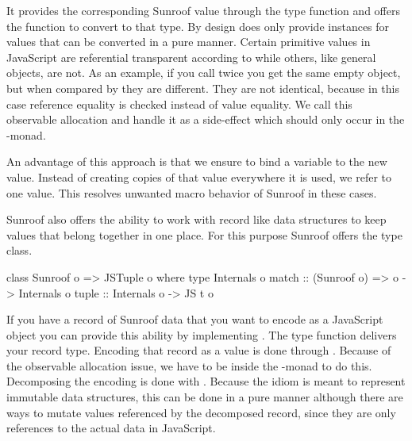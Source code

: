 It provides the corresponding Sunroof value through the type function
 \cite{Chakravarty:05:AssociatedTypeSynonyms} and offers the function 
 to convert to that type. By design  does
only provide instances for values that can be converted in a pure
manner. Certain primitive values in JavaScript are referential 
transparent according to \Src{==} while others, like general objects,
are not. As an example, if you call  twice you get the 
same empty object, but when compared by \Src{==} they are different. They
are not identical, because in this case reference equality is checked
instead of value equality. We call this observable allocation and handle 
it as a side-effect which should only occur in the \JS-monad. 

An advantage of this approach is that we ensure to bind a variable to the 
new value. Instead of creating copies of that value everywhere
it is used, we refer to one value. This resolves 
unwanted macro behavior of Sunroof in these cases.

Sunroof also offers the ability to work with record like data structures to 
keep values that belong together in one place.
For this purpose Sunroof offers the  type class.
\begin{Code}
class Sunroof o => JSTuple o where
  type Internals o
  match :: (Sunroof o) => o -> Internals o
  tuple :: Internals o -> JS t o
\end{Code}
If you have a record of Sunroof data that you want to
encode as a JavaScript object you can provide this ability 
by implementing . The  type function
delivers your record type. Encoding that record as a 
value is done through . 
Because of the observable allocation issue, we have to be 
inside the \JS-monad to do this.
Decomposing the encoding is done with . Because the
 idiom is meant to represent immutable data structures, this 
can be done in a pure manner although there are ways to mutate 
values referenced by the decomposed record, since they are only 
references to the actual data in JavaScript.

